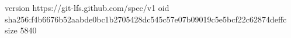 version https://git-lfs.github.com/spec/v1
oid sha256:f4b6676b52aabde0bc1b2705428dc545c57e07b09019c5e5bcf22c62874deffc
size 5840
